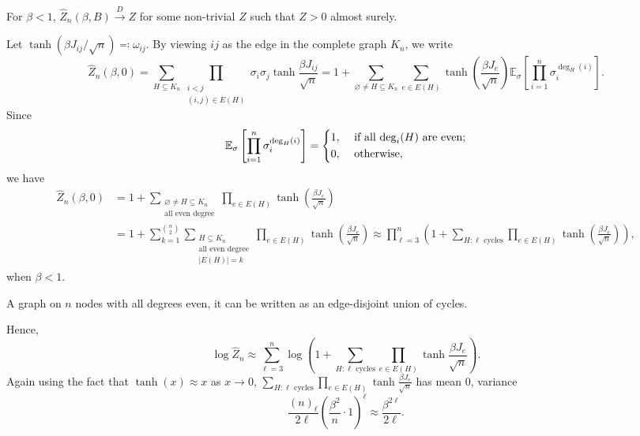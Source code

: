 \begin{claim}
	For \(\beta < 1\), \(\hat{Z} _n(\beta , B) \overset{D}{\to} Z\) for some non-trivial \(Z\) such that \(Z > 0\) almost surely.
\end{claim}
\begin{explanation}
	Let \(\tanh (\beta J_{ij} / \sqrt{n} ) \eqqcolon \omega _{ij}\). By viewing \(ij\) as the edge in the complete graph \(K_n\), we write
	\[
		\hat{Z} _n(\beta , 0)
		= \sum_{H \subseteq K_n} \prod_{\substack{i<j \\ (i, j) \in E(H)}} \sigma _i \sigma _j \tanh \frac{\beta J_{ij}}{\sqrt{n} }
		= 1 + \sum_{\varnothing \neq H \subseteq K_n} \sum_{e \in E(H)} \tanh(\frac{\beta J_e}{\sqrt{n} }) \mathbb{E}_{\sigma }\left[ \prod_{i=1}^{n} \sigma _i ^{\deg _H(i)} \right].
	\]
	Since
	\[
		\mathbb{E}_{\sigma }\left[ \prod_{i=1}^{n} \sigma _i ^{\deg _H(i)} \right]
		=\begin{dcases}
			1, & \text{ if all \(\deg _i(H)\) are even}  ; \\
			0, & \text{ otherwise} ,
		\end{dcases}
	\]
	we have
	\[
		\begin{split}
			\hat{Z} _n(\beta , 0)
			 & = 1 + \sum_{\substack{\varnothing \neq H \subseteq K_n          \\ \text{all even degree} }} \prod_{e \in E(H)} \tanh (\frac{\beta J_e}{\sqrt{n} }) \\
			 & = 1 + \sum_{k=1}^{\binom{n}{2}} \sum_{\substack{H \subseteq K_n \\ \text{all even degree} \\ \lvert E(H) \rvert = k}} \prod_{e \in E(H)} \tanh (\frac{\beta J_e}{\sqrt{n} })
			\approx \prod_{\ell = 3}^{n} \left( 1 + \sum_{H \colon \ell \text{ cycles} } \prod_{e \in E(H)} \tanh (\frac{\beta J_e}{\sqrt{n} }) \right),
		\end{split}
	\]
	when \(\beta < 1\).

	\begin{exercise}
		A graph on \(n\) nodes with all degrees even, it can be written as an edge-disjoint union of cycles.
	\end{exercise}

	Hence,
	\[
		\log \hat{Z} _n
		\approx \sum_{\ell =3}^{n} \log (1 + \sum_{H\colon \ell \text{ cycles} } \prod_{e \in E(H)} \tanh \frac{\beta J_e}{\sqrt{n} }).
	\]
	Again using the fact that \(\tanh (x) \approx x\) as \(x \to 0\), \(\sum_{H\colon \ell \text{ cycles} } \prod_{e \in E(H)} \tanh \frac{\beta J_e}{\sqrt{n} }\) has mean \(0\), variance
	\[
		\frac{(n)_{\ell } }{2 \ell } \left( \frac{\beta ^2}{n} \cdot 1\right) ^\ell
		\approx \frac{\beta ^{2 \ell }}{2 \ell }.
	\]


\end{explanation}
